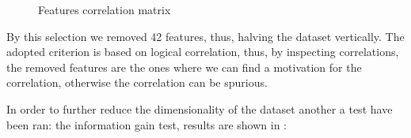 \begin{figure}[H]
    \label{fig:corr_matrix}
    \caption{Features correlation matrix}
\end{figure}



By this selection we removed 42 features, thus, halving the dataset vertically. The adopted criterion is based on logical correlation, thus, by inspecting correlations, the removed features are the ones where we can find a motivation for the correlation, otherwise the correlation can be spurious.

In order to further reduce the dimensionality of the dataset another a test have been ran: the information gain test, results are shown in :

